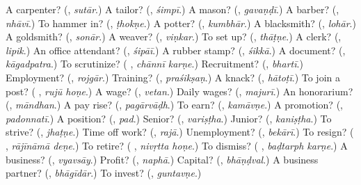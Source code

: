 \begin{tcolorbox}[breakable,colback=teal!4,colframe=teal!35!black,title={Before you move on}]
A carpenter? (\textbf{}, \emph{sutār}.) A tailor? (\textbf{}, \emph{śimpī}.) A mason? (\textbf{}, \emph{gavaṇḍī}.) A barber? (\textbf{}, \emph{nhāvī}.) To hammer in? (\textbf{}, \emph{ṭhokṇe}.) A potter? (\textbf{}, \emph{kumbhār}.) A blacksmith? (\textbf{}, \emph{lohār}.) A goldsmith? (\textbf{}, \emph{sonār}.) A weaver? (\textbf{}, \emph{viṇkar}.) To set up? (\textbf{}, \emph{thāṭṇe}.) A clerk? (\textbf{}, \emph{lipik}.) An office attendant? (\textbf{}, \emph{śipāī}.) A rubber stamp? (\textbf{}, \emph{śikkā}.) A document? (\textbf{}, \emph{kāgadpatra}.) To scrutinize? (\textbf{ }, \emph{chānnī karṇe}.) Recruitment? (\textbf{}, \emph{bhartī}.) Employment? (\textbf{}, \emph{rojgār}.) Training? (\textbf{}, \emph{praśikṣaṇ}.) A knack? (\textbf{}, \emph{hātoṭī}.) To join a post? (\textbf{ }, \emph{rujū hoṇe}.) A wage? (\textbf{}, \emph{vetan}.) Daily wages? (\textbf{}, \emph{majurī}.) An honorarium? (\textbf{}, \emph{māndhan}.) A pay rise? (\textbf{}, \emph{pagārvāḍh}.) To earn? (\textbf{}, \emph{kamāvṇe}.) A promotion? (\textbf{}, \emph{padonnatī}.) A position? (\textbf{}, \emph{pad}.) Senior? (\textbf{}, \emph{variṣṭha}.) Junior? (\textbf{}, \emph{kaniṣṭha}.) To strive? (\textbf{}, \emph{jhaṭṇe}.) Time off work? (\textbf{}, \emph{rajā}.) Unemployment? (\textbf{}, \emph{bekārī}.) To resign? (\textbf{ }, \emph{rājīnāmā deṇe}.) To retire? (\textbf{ }, \emph{nivṛtta hoṇe}.) To dismiss? (\textbf{ }, \emph{baḍtarph karṇe}.) A business? (\textbf{}, \emph{vyavsāy}.) Profit? (\textbf{}, \emph{naphā}.) Capital? (\textbf{}, \emph{bhāṇḍval}.) A business partner? (\textbf{}, \emph{bhāgīdār}.) To invest? (\textbf{}, \emph{guntavṇe}.)
\end{tcolorbox}

